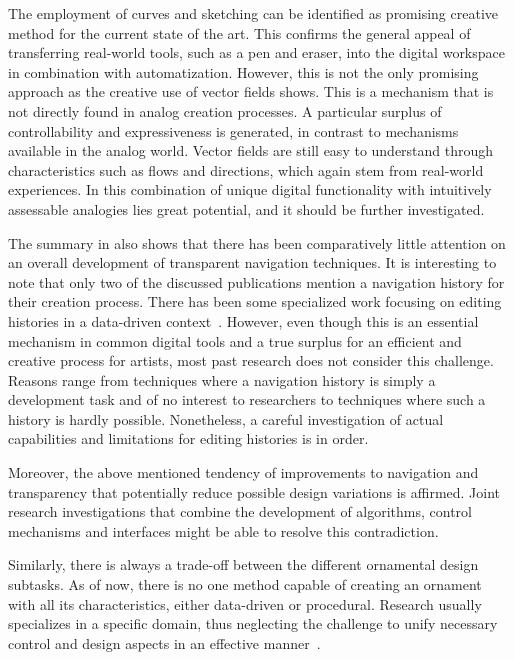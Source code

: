 The employment of curves and sketching can be identified as promising creative method for the current state of the art. This confirms the general appeal of transferring real-world tools, such as a pen and eraser, into the digital workspace in combination with automatization. However, this is not the only promising approach as the creative use of vector fields shows. This is a mechanism that is not directly found in analog creation processes. A particular surplus of controllability and expressiveness is generated, in contrast to mechanisms available in the analog world. Vector fields are still easy to understand through characteristics such as flows and directions, which again stem from real-world experiences. In this combination of unique digital functionality with intuitively assessable analogies lies great potential, and it should be further investigated.

The summary in  also shows that there has been comparatively little attention on an overall development of transparent navigation techniques. It is interesting to note that only two of the discussed publications mention a navigation history for their creation process. There has been some specialized work focusing on editing histories in a data-driven context~\cite{hu_2013_iie,chen_2016_dah}. However, even though this is an essential mechanism in common digital tools and a true surplus for an efficient and creative process for artists, most past research does not consider this challenge. Reasons range from techniques where a navigation history is simply a development task and of no interest to researchers to techniques where such a history is hardly possible. Nonetheless, a careful investigation of actual capabilities and limitations for editing histories is in order.

Moreover, the above mentioned tendency of improvements to navigation and transparency that potentially reduce possible design variations is affirmed. Joint research investigations that combine the development of algorithms, control mechanisms and interfaces might be able to resolve this contradiction.

Similarly, there is always a trade-off between the different ornamental design subtasks. As of now, there is no one method capable of creating an ornament with all its characteristics, either data-driven or procedural. Research usually specializes in a specific domain, thus neglecting the challenge to unify necessary control and design aspects in an effective manner~\cite{smelik_2014_aso}.

